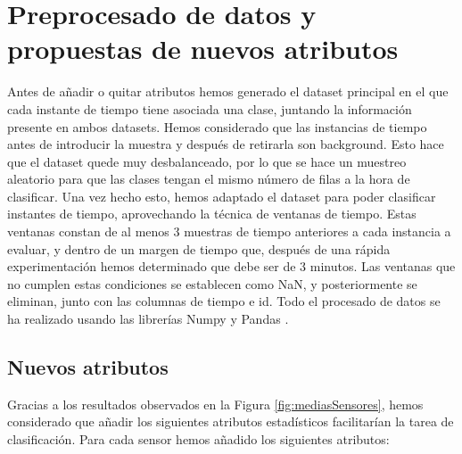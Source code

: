 \documentclass{esannV2}
\begin{document}
\section{Preprocesado de datos y propuestas de nuevos atributos}
\label{section:preprocesado}
Antes de añadir o quitar atributos hemos generado el dataset principal en el que cada instante de tiempo tiene asociada una clase, juntando la información presente en ambos datasets. Hemos considerado que las instancias de tiempo antes de introducir la muestra y después de retirarla son background. Esto hace que el dataset quede muy desbalanceado, por lo que se hace un muestreo aleatorio para que las clases tengan el mismo número de filas a la hora de clasificar.
\newline\newline
Una vez hecho esto, hemos adaptado el dataset para poder clasificar instantes de tiempo, aprovechando la técnica de ventanas de tiempo. Estas ventanas constan de al menos 3 muestras de tiempo anteriores a cada instancia a evaluar, y dentro de un margen de tiempo que, después de una rápida experimentación hemos determinado que debe ser de 3 minutos. Las ventanas que no cumplen estas condiciones se establecen como NaN, y posteriormente se eliminan, junto con las columnas de tiempo e id.
Todo el procesado de datos se ha realizado usando las librerías Numpy \cite{numpy} y Pandas \cite{pandas}.

\subsection{Nuevos atributos}\label{section:nuevosAtributos}
Gracias a los resultados observados en la Figura \ref{fig:mediasSensores}, hemos considerado que añadir los siguientes atributos estadísticos facilitarían la tarea de clasificación. Para cada sensor hemos añadido los siguientes atributos:
\end{document}
